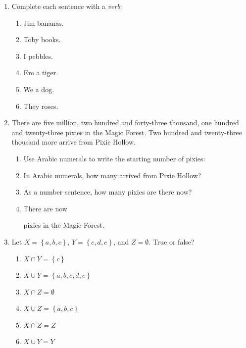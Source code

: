 \documentclass{tufte-book}
\begin{document}
\begin{enumerate}
  \item Complete each sentence with a \emph{verb}:
  \begin{multicols}{2}
  \begin{enumerate}
    \item Jim \dotfill bananas.\bigskip
    \item Toby \dotfill books.\bigskip
    \item I \dotfill pebbles.
    \item Em \dotfill a tiger.\bigskip
    \item We \dotfill a dog.\bigskip
    \item They \dotfill roses.
  \end{enumerate}
  \end{multicols}

  \item There are five million, two hundred and forty-three thousand, one hundred and twenty-three pixies
  in the Magic Forest. Two hundred and twenty-three thousand more arrive from Pixie Hollow.
  \begin{enumerate}\bigskip
    \item Use Arabic numerals to write the starting number of pixies:\dotfill\bigskip\par\dotfill\bigskip
    \item In Arabic numerals, how many arrived from Pixie Hollow?\dotfill\bigskip\par\dotfill\bigskip
    \item As a number sentence, how many pixies are there now?\dotfill\bigskip\par\dotfill\bigskip
    \item There are now \dotfill\bigskip\par
    \dotfill\bigskip\par\dotfill\bigskip\par\dotfill\bigskip pixies in the Magic Forest.
  \end{enumerate}
  
  \item Let $X = \left\{a, b, c\right\}$, $Y = \left\{c, d, e\right\}$, and $Z = \emptyset$. True or false?
  \begin{multicols}{2}
  \begin{enumerate}
    \item $X \cap Y = \left\{c\right\}$ \dotfill\bigskip
    \item $X \cup Y = \left\{a, b, c, d, e\right\}$ \dotfill\bigskip
    \item $X \cap Z = \emptyset$ \dotfill
    \item $X \cup Z = \left\{a, b, c\right\}$ \dotfill\bigskip
    \item $X \cap Z = Z$ \dotfill\bigskip
    \item $X \cup Y = Y$ \dotfill
  \end{enumerate}
  \end{multicols}

\end{enumerate}
\end{document}
